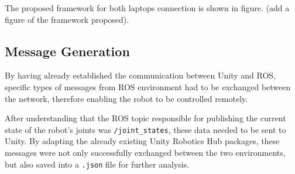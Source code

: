 The proposed framework for both laptops connection is shown in figure. (add a figure of the framework proposed).




\subsection{Message Generation}

By having already established the communication between Unity and ROS, specific types of messages from ROS environment had to be exchanged between the network, therefore enabling the robot to be controlled remotely.

After understanding that the ROS topic responsible for publishing the current state of the robot's joints was \texttt{/joint\_states}, these data needed to be sent to Unity. By adapting the already existing Unity Robotics Hub packages, these messages were not only successfully exchanged between the two environments, but also saved into a \texttt{.json} file for further analysis.



